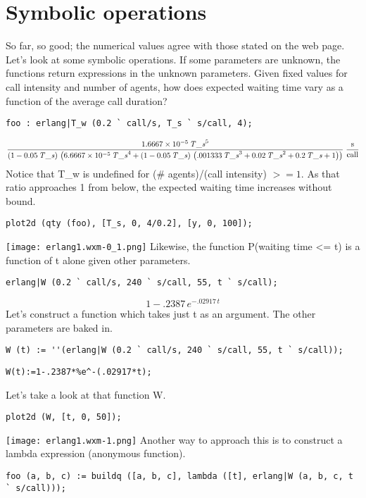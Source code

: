 \documentclass[12pt]{article}
\begin{document}
\section{Symbolic operations
}
So far, so good; the numerical values agree with those stated on the web page.
Let's look at some symbolic operations.
If some parameters are unknown, the functions return expressions in the unknown parameters.
Given fixed values for call intensity and number of agents,
how does expected waiting time vary as a function of the average call duration?
\begin{verbatim}
foo : erlang|T_w (0.2 ` call/s, T_s ` s/call, 4);
\end{verbatim}
$${{1.6667 \times 10^{-5}\,{\it T\_s}^5}\over{\left(1-0.05\,
 {\it T\_s}\right)\,\left(6.6667 \times 10^{-5}\,{\it T\_s}^4+\left(1
 -0.05\,{\it T\_s}\right)\,\left(.001333\,{\it T\_s}^3+0.02\,
 {\it T\_s}^2+0.2\,{\it T\_s}+1\right)\right)}}\;{{\mathrm{s}}\over{
 \mathrm{call}}}$$
Notice that T_w is undefined for (\# agents)/(call intensity) $>= 1$.
As that ratio approaches 1 from below, the expected waiting time increases without bound.
\begin{verbatim}
plot2d (qty (foo), [T_s, 0, 4/0.2], [y, 0, 100]);
\end{verbatim}
\texttt{[image: erlang1.wxm-0\_1.png]} 
Likewise, the function P(waiting time <= t) is a function of t alone given other parameters.
\begin{verbatim}
erlang|W (0.2 ` call/s, 240 ` s/call, 55, t ` s/call);
\end{verbatim}
$$1-.2387\,e^ {- .02917\,t }$$
Let's construct a function which takes just t as an argument. The other parameters are baked in.
\begin{verbatim}
W (t) := ''(erlang|W (0.2 ` call/s, 240 ` s/call, 55, t ` s/call));
\end{verbatim}

\begin{verbatim}
W(t):=1-.2387*%e^-(.02917*t);
\end{verbatim}

Let's take a look at that function W.
\begin{verbatim}
plot2d (W, [t, 0, 50]);
\end{verbatim}
\texttt{[image: erlang1.wxm-1.png]} 
Another way to approach this is to construct a lambda expression (anonymous function).
\begin{verbatim}
foo (a, b, c) := buildq ([a, b, c], lambda ([t], erlang|W (a, b, c, t ` s/call)));
\end{verbatim}
\end{document}
